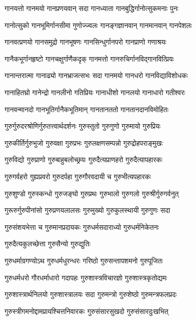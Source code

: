 \twolineshloka
{गानयत्तो गानमयो गानप्रणयवान् सदा}%
{गानध्याता गानबुद्धिर्गानोत्सुकमनाः पुनः}%

\twolineshloka
{गानोत्सुको गानभूमिर्गानसीमा गुणोज्ज्वलः}%
{गानङ्गज्ञानवान् गानमानवान् गानपेशलः}%

\twolineshloka
{गानवत्प्रणयो गानसमुद्रो गानभूषणः}%
{गानसिन्धुर्गानपरो गानप्राणो गणाश्रयः}%

\twolineshloka
{गानैकभूर्गानहृष्टो गानचक्षुर्गाणैकदृक्}%
{गानमत्तो गानरुचिर्गानविद्गानवित्प्रियः}%

\twolineshloka
{गानान्तरात्मा गानाढ्यो गानभ्राजत्सभः सदा}%
{गानमयो गानधरो गानविद्याविशोधकः}%

\twolineshloka
{गानाहितघ्रो गानेन्द्रो गानलीनो गतिप्रियः}%
{गानाधीशो गानलयो गानाधारो गतीश्वरः}%

\twolineshloka
{गानवन्मानदो गानभूतिर्गानैकभूतिमान्}%
{गानतानततो गानतानदानविमोहितः}%

\twolineshloka
{गुरुर्गुरुदरश्रोणिर्गुरुतत्त्वार्थदर्शनः}%
{गुरुस्तुतो गुरुगुणो गुरुमायो गुरुप्रियः}%

\twolineshloka
{गुरुकीर्तिर्गुरुभुजो गुरुवक्षा गुरुप्रभः}%
{गुरुलक्षणसम्पन्नो गुरुद्रोहपराङ्मुखः}%

\twolineshloka
{गुरुविद्यो गुरुप्राणो गुरुबाहुबलोच्छ्रयः}%
{गुरुदैत्यप्राणहरो गुरुदैत्यापहारकः}%

\twolineshloka
{गुरुगर्वहरो गुह्यप्रवरो गुरुदर्पहा}%
{गुरुगौरवदायी च गुरुभीत्यपहारकः}%

\twolineshloka
{गुरुशुण्डो गुरुस्कन्धो गुरुजङ्घो गुरुप्रथः}%
{गुरुभालो गुरुगलो गुरुश्रीर्गुरुगर्वनुत्}

\twolineshloka
{गुरूरुर्गुरुपीनांसो गुरुप्रणयलालसः}%
{गुरुमुख्यो गुरुकुलस्थायी गुरुगुणः सदा}%

\twolineshloka
{गुरुसंशयभेत्ता च गुरुमानप्रदायकः}%
{गुरुधर्मसदाराध्यो गुरुधर्मनिकेतनः}%

\onelineshloka
{गुरुदैत्यकुलच्छेत्ता गुरुसैन्यो गुरुद्युतिः}%

\twolineshloka
{गुरुधर्माग्रगण्योऽथ गुरुधर्मधुरन्धरः}%
{गरिष्ठो गुरुसन्तापशमनो गुरुपूजितः}%

\twolineshloka
{गुरुधर्मधरो गौरधर्माधारो गदापहः}%
{गुरुशास्त्रविचारज्ञो गुरुशास्त्रकृतोद्यमः}%

\twolineshloka
{गुरुशास्त्रार्थनिलयो गुरुशास्त्रालयः सदा}%
{गुरुमन्त्रो गुरुशेष्ठो गुरुमन्त्रफलप्रदः}%

\twolineshloka
{गुरुस्त्रीगमनोद्दामप्रायश्चित्तनिवारकः}%
{गुरुसंसारसुखदो गुरुसंसारदुःखभित्}%

